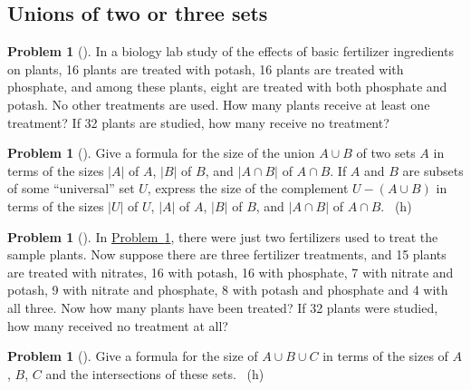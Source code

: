 \documentclass[10pt,]{book}
\theoremstyle{plain}
\theoremstyle{definition}
\newtheorem{activity}[project]{Problem}
\theoremstyle{definition}
\numberwithin{equation}{chapter}
\begin{document}
\subsection[{Unions of two or three sets}]{Unions of two or three sets}\label{subsection-51}
\begin{activity}[] \label{fertilizer2}
\hypertarget{p-1318}{}%
In a biology lab study of the effects of basic fertilizer ingredients on plants, 16 plants are treated with potash, 16 plants are treated with phosphate, and among these plants, eight are treated with both phosphate and potash. No other treatments are used. How many plants receive at least one treatment? If 32 plants are studied, how many receive no treatment?%
\end{activity}
\begin{activity}[] \label{twosetintersection}
\hypertarget{p-1320}{}%
Give a formula for the size of the union \(A\cup B\) of two sets \(A\) in terms of the sizes \(|A|\) of \(A\), \(|B|\) of \(B\), and \(|A\cap B|\) of \(A\cap B\). If \(A\) and \(B\) are subsets of some ``universal'' set \(U\), express the size of the complement \(U-(A\cup B)\) in terms of the sizes \(|U|\) of \(U\), \(|A|\) of \(A\), \(|B|\) of \(B\), and \(|A\cap B|\) of \(A\cap B\).%
~{\tiny (h)}\end{activity}
\begin{activity}[] \label{activity-227}
\hypertarget{p-1324}{}%
In \hyperref[fertilizer2]{Problem~\ref{fertilizer2}}, there were just two fertilizers used to treat the sample plants. Now suppose there are three fertilizer treatments, and 15 plants are treated with nitrates, 16 with potash, 16 with phosphate, 7 with nitrate and potash, 9 with nitrate and phosphate, 8 with potash and phosphate and 4 with all three. Now how many plants have been treated? If 32 plants were studied, how many received no treatment at all?%
\end{activity}
\begin{activity}[] \label{threesetintersection}
\hypertarget{p-1326}{}%
Give a formula for the size of \(A\cup B\cup C\) in terms of the sizes of \(A\), \(B\), \(C\) and the intersections of these sets.%
~{\tiny (h)}\end{activity}
\typeout{************************************************}
\typeout{************************************************}
\end{document}
